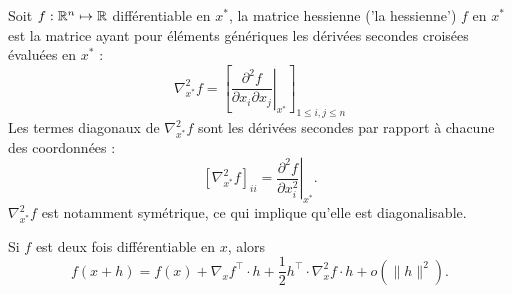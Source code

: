 \begin{definition}
  Soit $f : \mathbb{R}^n \mapsto \mathbb{R}$ différentiable en $x^*$, la matrice hessienne ('la hessienne') $f$ en $x^*$ est la matrice ayant pour éléments génériques les dérivées secondes croisées évaluées en $x^*$ : 
  $$
  \nabla^2_{x^*}f 
  = \left[\left.\frac{\partial^2 f}{\partial x_i\partial x_j}\right|_{x^*} \right]_{1 \leq i, j \leq n}
  $$
  Les termes diagonaux de $\nabla^2_{x^*}f$ sont les dérivées secondes par rapport à chacune des coordonnées : 
  $$
  \left[ \nabla^2_{x^*}f \right]_{ii} 
  = \left.\frac{\partial^2 f}{\partial x_i^2}\right|_{x^*}.
  $$
  $\nabla^2_{x^*}f$ est notamment symétrique, ce qui implique qu'elle est diagonalisable.
\end{definition}

\begin{proposition} \label{prop:taylorOrdre2}
  Si $f$ est deux fois différentiable en $x$, alors
  $$
  f(x+h) = f(x) + \nabla_x f^\top \cdot h + \frac12 h^\top \cdot \nabla^2_x f \cdot h + o(\|h\|^2).
  $$
\end{proposition}

